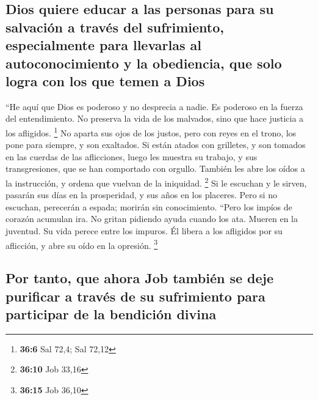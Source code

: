 \begin{paracol}{2}
\hypertarget{dios-quiere-educar-a-las-personas-para-su-salvaciuxf3n-a-travuxe9s-del-sufrimiento-especialmente-para-llevarlas-al-autoconocimiento-y-la-obediencia-que-solo-logra-con-los-que-temen-a-dios}{%
\subsection{Dios quiere educar a las personas para su salvación a través
del sufrimiento, especialmente para llevarlas al autoconocimiento y la
obediencia, que solo logra con los que temen a
Dios}\label{dios-quiere-educar-a-las-personas-para-su-salvaciuxf3n-a-travuxe9s-del-sufrimiento-especialmente-para-llevarlas-al-autoconocimiento-y-la-obediencia-que-solo-logra-con-los-que-temen-a-dios}}

 ``He aquí que Dios es poderoso y no desprecia a nadie. Es
poderoso en la fuerza del entendimiento.  No preserva la
vida de los malvados, sino que hace justicia a los afligidos.
\footnote{\textbf{36:6} Sal 72,4; Sal 72,12}  No aparta
sus ojos de los justos, pero con reyes en el trono, los pone para
siempre, y son exaltados.  Si están atados con grilletes,
y son tomados en las cuerdas de las aflicciones,  luego
les muestra su trabajo, y sus transgresiones, que se han comportado con
orgullo.  También les abre los oídos a la instrucción, y
ordena que vuelvan de la iniquidad. \footnote{\textbf{36:10} Job 33,16}
 Si le escuchan y le sirven, pasarán sus días en la
prosperidad, y sus años en los placeres.  Pero si no
escuchan, perecerán a espada; morirán sin conocimiento. 
``Pero los impíos de corazón acumulan ira. No gritan pidiendo ayuda
cuando los ata.  Mueren en la juventud. Su vida perece
entre los impuros.  Él libera a los afligidos por su
aflicción, y abre su oído en la opresión. \footnote{\textbf{36:15} Job
  36,10}

\hypertarget{por-tanto-que-ahora-job-tambiuxe9n-se-deje-purificar-a-travuxe9s-de-su-sufrimiento-para-participar-de-la-bendiciuxf3n-divina}{%
\subsection{Por tanto, que ahora Job también se deje purificar a través
de su sufrimiento para participar de la bendición
divina}\label{por-tanto-que-ahora-job-tambiuxe9n-se-deje-purificar-a-travuxe9s-de-su-sufrimiento-para-participar-de-la-bendiciuxf3n-divina}}


\end{paracol}
